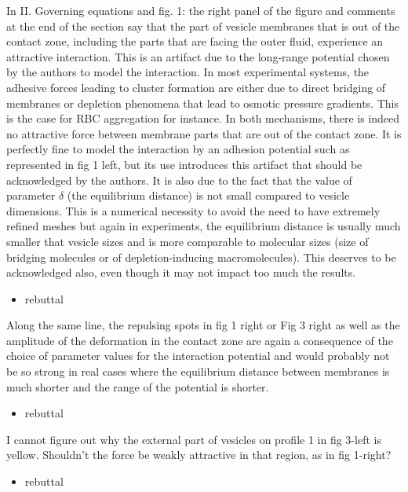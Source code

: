 \documentclass[11pt]{article}
\newcommand{\comment}[1]{{\color{blue} #1}}
\begin{document}
\noindent
\comment{In II. Governing equations and fig. 1: the right panel of the
figure and comments at the end of the section say that the part of
vesicle membranes that is out of the contact zone, including the parts
that are facing the outer fluid, experience an attractive interaction.
This is an artifact due to the long-range potential chosen by the
authors to model the interaction. In most experimental systems, the
adhesive forces leading to cluster formation are either due to direct
bridging of membranes or depletion phenomena that lead to osmotic
pressure gradients. This is the case for RBC aggregation for instance.
In both mechanisms, there is indeed no attractive force between membrane
parts that are out of the contact zone. It is perfectly fine to model
the interaction by an adhesion potential such as represented in fig 1
left, but its use introduces this artifact that should be acknowledged
by the authors. It is also due to the fact that the value of parameter
$\delta$ (the equilibrium distance) is not small compared to vesicle
dimensions. This is a numerical necessity to avoid the need to have
extremely refined meshes but again in experiments, the equilibrium
distance is usually much smaller that vesicle sizes and is more
comparable to molecular sizes (size of bridging molecules or of
depletion-inducing macromolecules). This deserves to be acknowledged
also, even though it may not impact too much the results.}
\begin{itemize}
  \item rebuttal
\end{itemize}

\noindent
\comment{Along the same line, the repulsing spots in fig 1 right or Fig 3
right as well as the amplitude of the deformation in the contact zone
are again a consequence of the choice of parameter values for the
interaction potential and would probably not be so strong in real
cases where the equilibrium distance between membranes is much shorter
and the range of the potential is shorter.}
\begin{itemize}
  \item rebuttal
\end{itemize}

\noindent
\comment{I cannot figure out why the external part of vesicles on profile 1
in fig 3-left is yellow. Shouldn't the force be weakly attractive in
that region, as in fig 1-right?}
\begin{itemize}
  \item rebuttal
\end{itemize}
\end{document}
